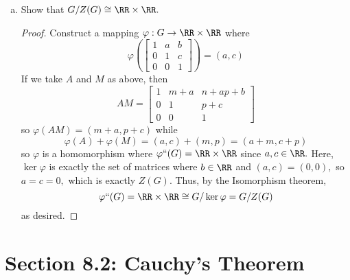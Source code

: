 \documentclass{article}
\begin{document}
\begin{itemize}
\begin{enumerate}[(a)]
\begin{proof}
		\end{proof}
		\item Show that $G/Z(G)\cong \RR\times\RR.$
			\begin{proof}
				Construct a mapping $\varphi:G\to \RR\times \RR$ where \[\varphi\left( \begin{bmatrix}
						1 & a & b \\ 0 & 1 & c \\ 0 & 0 & 1
				\end{bmatrix}\right) = (a, c)\] If we take $A$ and $M$ as above, then \[AM=\begin{bmatrix}
						1 & m+a & n+ap+b \\ 0 & 1 & p+c \\ 0 & 0 & 1
				\end{bmatrix}\] so $\varphi(AM)=(m+a, p+c)$ while \[\varphi(A)+\varphi(M)=(a, c) + (m, p) = (a+m, c+p)\] so $\varphi$ is a homomorphism where $\varphi``(G)=\RR\times\RR$ since $a, c\in \RR.$ Here, $\ker \varphi$ is exactly the set of matrices where $b\in \RR$ and $(a, c)=(0, 0),$ so $a=c=0,$ which is exactly $Z(G).$ Thus, by the Isomorphism theorem, \[\varphi``(G) = \RR\times \RR \cong G/\ker \varphi = G/Z(G)\] as desired.
				
			\end{proof}
			
	\end{enumerate}
		
\end{itemize} 
\section*{Section 8.2: Cauchy's Theorem}
\end{document}
